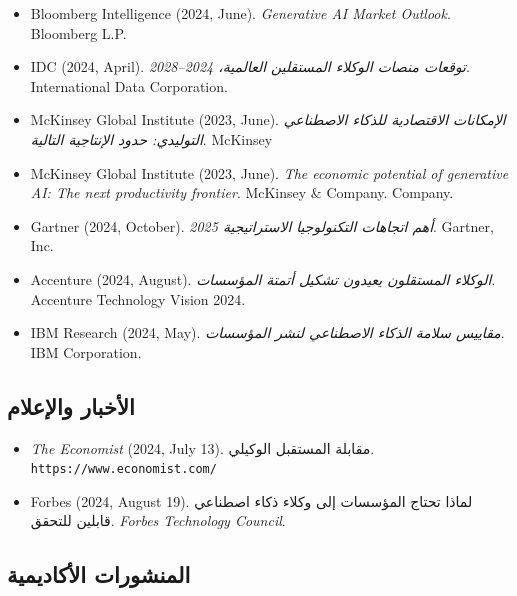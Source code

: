 \documentclass[11pt]{article}
\begin{document}
\begin{itemize}[leftmargin=*, label={}]
  \item Bloomberg Intelligence (2024, June). \textit{Generative AI Market Outlook}. Bloomberg L.P.

  \item IDC (2024, April). \textit{توقعات منصات الوكلاء المستقلين العالمية، 2024--2028}. International Data Corporation.

  \item McKinsey Global Institute (2023, June). \textit{الإمكانات الاقتصادية للذكاء الاصطناعي التوليدي: حدود الإنتاجية التالية}. McKinsey \  \item McKinsey Global Institute (2023, June). \textit{The economic potential of generative AI: The next productivity frontier}. McKinsey \& Company. Company.

  \item Gartner (2024, October). \textit{أهم اتجاهات التكنولوجيا الاستراتيجية 2025}. Gartner, Inc.

  \item Accenture (2024, August). \textit{الوكلاء المستقلون يعيدون تشكيل أتمتة المؤسسات}. Accenture Technology Vision 2024.

  \item IBM Research (2024, May). \textit{مقاييس سلامة الذكاء الاصطناعي لنشر المؤسسات}. IBM Corporation.
\end{itemize}

\subsection*{الأخبار والإعلام}

\begin{itemize}[leftmargin=*, label={}]
  \item \textit{The Economist} (2024, July 13). مقابلة المستقبل الوكيلي. \texttt{https://www.economist.com/}

  \item Forbes (2024, August 19). لماذا تحتاج المؤسسات إلى وكلاء ذكاء اصطناعي قابلين للتحقق. \textit{Forbes Technology Council}.
\end{itemize}

\subsection*{المنشورات الأكاديمية}
\end{document}
